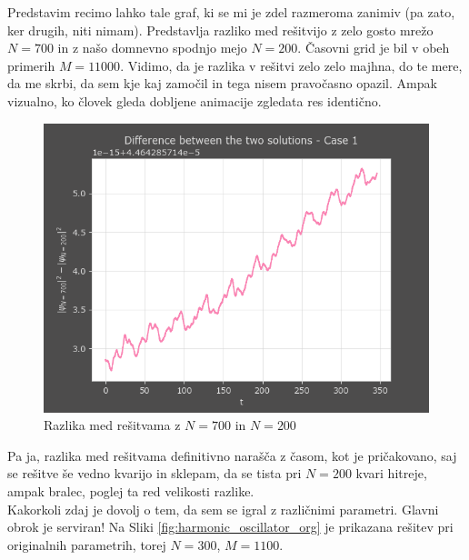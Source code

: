 \documentclass[a4paper]{article}
\begin{document}
Predstavim recimo lahko tale graf, ki se mi je zdel razmeroma zanimiv (pa zato, ker drugih, niti
nimam). Predstavlja razliko med rešitvijo z zelo gosto mrežo $N=700$ in z našo domnevno spodnjo
mejo $N=200$. Časovni grid je bil v obeh primerih $M=11000$. Vidimo, da je razlika v rešitvi
zelo zelo majhna, do te mere, da me skrbi, da sem kje kaj zamočil in tega nisem pravočasno opazil.
Ampak vizualno, ko človek gleda dobljene animacije zgledata res identično.

\begin{figure}[H]
    \centering
    \includegraphics[width=\textwidth]{./images/delta_N700_N200.png}
    \caption{Razlika med rešitvama z $N=700$ in $N=200$}
\end{figure}

Pa ja, razlika med rešitvama definitivno narašča z časom, kot je pričakovano, saj se rešitve še vedno kvarijo
in sklepam, da se tista pri $N=200$ kvari hitreje, ampak bralec, poglej ta red velikosti razlike. \\

Kakorkoli zdaj je dovolj o tem, da sem se igral z različnimi parametri. Glavni obrok je serviran! Na Sliki
\ref{fig:harmonic_oscillator_org} je prikazana rešitev pri originalnih parametrih, torej $N=300$, $M=1100$.
\end{document}
